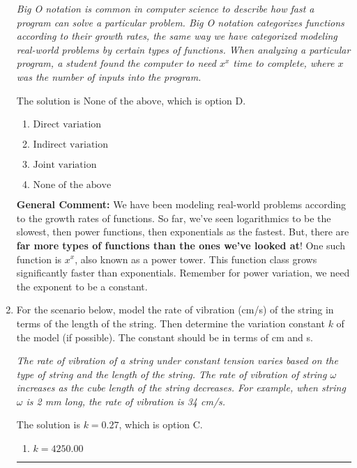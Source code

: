 \documentclass{extbook}[14pt]
\newcommand{\litem}[1]{\item #1

\rule{\textwidth}{0.4pt}}
\begin{document}
\begin{enumerate}
{\begin{center}
    \textit{ Big O notation is common in computer science to describe how fast a program can solve a particular problem. Big O notation categorizes functions according to their growth rates, the same way we have categorized modeling real-world problems by certain types of functions. When analyzing a particular program, a student found the computer to need $x^x$ time to complete, where $x$ was the number of inputs into the program. }
\end{center}
The solution is \( \text{None of the above} \), which is option D.\begin{enumerate}[label=\Alph*.]
\item \( \text{Direct variation} \)


\item \( \text{Indirect variation} \)


\item \( \text{Joint variation} \)


\item \( \text{None of the above} \)


\end{enumerate}

\textbf{General Comment:} We have been modeling real-world problems according to the growth rates of functions. So far, we've seen logarithmics to be the slowest, then power functions, then exponentials as the fastest. But, there are \textbf{far more types of functions than the ones we've looked at}! One such function is $x^x$, also known as a power tower. This function class grows significantly faster than exponentials. Remember for power variation, we need the exponent to be a constant.
}
\litem{
For the scenario below, model the rate of vibration (cm/s) of the string in terms of the length of the string. Then determine the variation constant $k$ of the model (if possible). The constant should be in terms of cm and s.

\begin{center}
    \textit{ The rate of vibration of a string under constant tension varies based on the type of string and the length of the string. The rate of vibration of string $\omega$ increases as the cube length of the string decreases. For example, when string $\omega$ is 2 mm long, the rate of vibration is 34 cm/s. }
\end{center}
The solution is \( k = 0.27 \), which is option C.\begin{enumerate}[label=\Alph*.]
\item \( k = 4250.00 \)


\end{enumerate}}
\end{enumerate}
\end{document}

